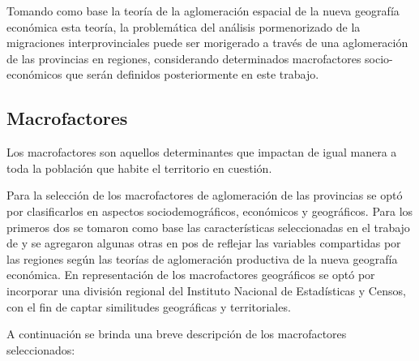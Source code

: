 \documentclass[12pt,a4paper]{article}
\begin{document}
Tomando como base la teoría de la aglomeración espacial de la nueva geografía económica esta teoría, la problemática del análisis pormenorizado de la migraciones interprovinciales puede ser morigerado a través de una aglomeración de las provincias en regiones, considerando determinados macrofactores socio-económicos que serán definidos posteriormente en este trabajo. 

\subsection{Macrofactores}
Los macrofactores son aquellos determinantes que impactan de igual manera a toda la población que habite el territorio en cuestión.

Para la selección de los macrofactores de aglomeración de las provincias se optó por clasificarlos en aspectos sociodemográficos, económicos y geográficos. Para los primeros dos se tomaron como base las características seleccionadas en  el trabajo de \textcite{cicowiez_caracterizacion_2003} y se agregaron algunas otras en pos de reflejar las variables compartidas por las regiones según las teorías de aglomeración productiva de la nueva geografía económica. En representación de los macrofactores geográficos se optó por incorporar una división regional del Instituto Nacional de Estadísticas y Censos, con el fin de captar similitudes geográficas y territoriales.


A continuación se brinda una breve descripción de los macrofactores seleccionados:
\end{document}
